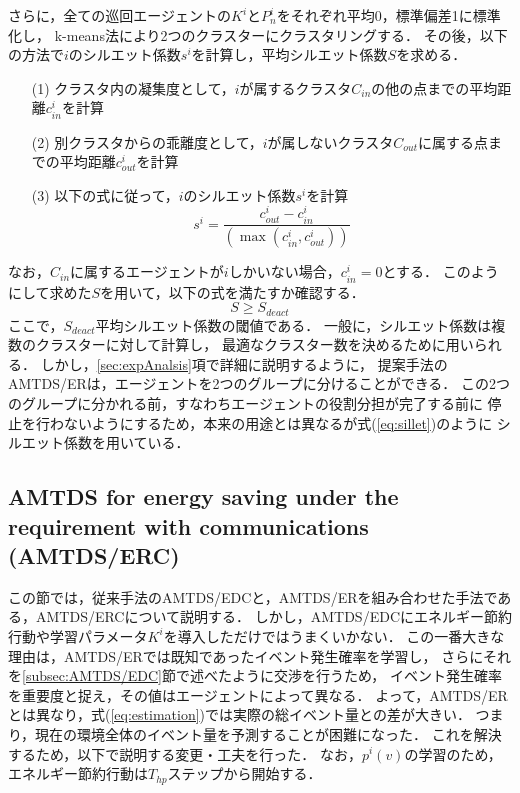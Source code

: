 \documentclass[12pt,a4j,twoside]{jarticle}
\begin{document}
  さらに，全ての巡回エージェントの$K^i$と$P^i_n$をそれぞれ平均0，標準偏差1に標準化し，
  k-means法により2つのクラスターにクラスタリングする．
  その後，以下の方法で$i$のシルエット係数$s^i$を計算し，平均シルエット係数$S$を求める．
  \begin{enumerate}
    \item[(1)] クラスタ内の凝集度として，$i$が属するクラスタ$C_{in}$の他の点までの平均距離$c^i_{in}$を計算
    \item[(2)] 別クラスタからの乖離度として，$i$が属しないクラスタ$C_{out}$に属する点までの平均距離$c^i_{out}$を計算
    \item[(3)] 以下の式に従って，$i$のシルエット係数$s^i$を計算
                \begin{equation}
                  s^i = \dfrac{c^i_{out} - c^i_{in}}{(\max(c^i_{in}, c^i_{out}))}
                \end{equation}
  \end{enumerate}
  なお，$C_{in}$に属するエージェントが$i$しかいない場合，$c^i_{in} = 0$とする．
  このようにして求めた$S$を用いて，以下の式を満たすか確認する．
    \begin{equation}\label{eq:sillet}
      S \geq S_{deact}
    \end{equation}
  ここで，$S_{deact}$平均シルエット係数の閾値である．
  一般に，シルエット係数は複数のクラスターに対して計算し，
  最適なクラスター数を決めるために用いられる．
  しかし，\ref{sec:expAnalsis}項で詳細に説明するように，
  提案手法のAMTDS/ERは，エージェントを2つのグループに分けることができる．
  この2つのグループに分かれる前，すなわちエージェントの役割分担が完了する前に
  停止を行わないようにするため，本来の用途とは異なるが式(\ref{eq:sillet})のように
  シルエット係数を用いている．
 
  \subsection{AMTDS for energy saving under the requirement with communications (AMTDS/ERC)}
  この節では，従来手法のAMTDS/EDCと，AMTDS/ERを組み合わせた手法である，AMTDS/ERCについて説明する．
  しかし，AMTDS/EDCにエネルギー節約行動や学習パラメータ$K^i$を導入しただけではうまくいかない．
  この一番大きな理由は，AMTDS/ERでは既知であったイベント発生確率を学習し，
  さらにそれを\ref{subsec:AMTDS/EDC}節で述べたように交渉を行うため，
  イベント発生確率を重要度と捉え，その値はエージェントによって異なる．
  よって，AMTDS/ERとは異なり，式(\ref{eq:estimation})では実際の総イベント量との差が大きい．
  つまり，現在の環境全体のイベント量を予測することが困難になった．
  これを解決するため，以下で説明する変更・工夫を行った．
  なお，$p^i(v)$の学習のため，エネルギー節約行動は$T_{hp}$ステップから開始する．
  
\end{document}
